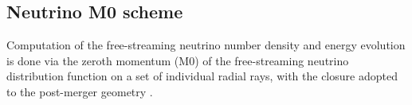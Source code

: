 





\subsection{Neutrino M0 scheme}


Computation of the free-streaming neutrino number density and energy evolution is 
done via the zeroth momentum (M0) of the free-streaming neutrino distribution 
function on a set of individual radial rays, with the closure adopted 
to the post-merger geometry \citep{Radice:2016dwd,Radice:2018pdn}.


